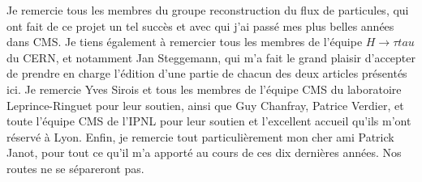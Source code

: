 \documentclass[11pt,twoside,a4paper,tdr]{cms-tdr}
\begin{document}
Je remercie tous les membres du groupe reconstruction du flux de particules, qui ont fait de ce projet un tel succès et avec qui j'ai passé mes plus belles années dans CMS.  
Je tiens également à remercier tous les membres de l'équipe $H \to \tau tau$ du CERN, et notamment Jan Steggemann, qui m'a fait le grand plaisir d'accepter de prendre en charge l'édition d'une partie de chacun des deux articles présentés ici.  
Je remercie Yves Sirois et tous les membres de l'équipe CMS du laboratoire Leprince-Ringuet pour leur soutien, 
ainsi que Guy Chanfray, Patrice Verdier, et toute l'équipe CMS de l'IPNL pour leur soutien et l'excellent accueil qu'ils m'ont réservé à Lyon. 
Enfin, je remercie tout particulièrement mon cher ami Patrick Janot, pour tout ce qu'il m'a apporté au cours de ces dix dernières années. Nos routes ne se sépareront pas. 
\end{document}
